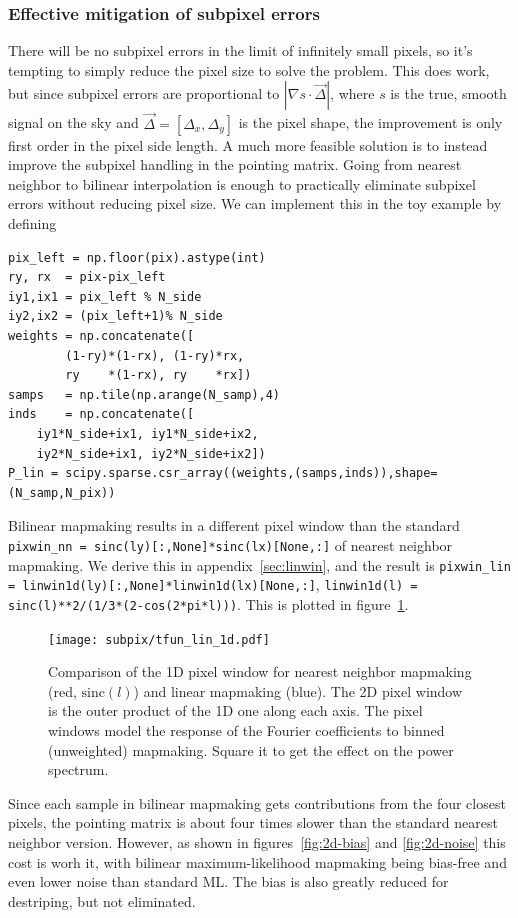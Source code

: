 \documentclass[twocolumn,apj]{aastex63}
\begin{document}
\subsubsection{Effective mitigation of subpixel errors}
There will be no subpixel errors in the limit of infinitely small pixels,
so it's tempting to simply reduce the pixel size to solve the problem. This
does work, but since subpixel errors are proportional to $|\nabla s \cdot \vec \Delta|$,
where $s$ is the true, smooth signal on the sky and $\vec \Delta = [\Delta_x,\Delta_y]$
is the pixel shape, the improvement is only first order in the pixel side length.
A much more feasible solution is to instead improve the subpixel handling in the
pointing matrix. Going from nearest neighbor to bilinear interpolation is enough
to practically eliminate subpixel errors without reducing pixel size. We can
implement this in the toy example by defining
\begin{lstlisting}
pix_left = np.floor(pix).astype(int)
ry, rx  = pix-pix_left
iy1,ix1 = pix_left % N_side
iy2,ix2 = (pix_left+1)% N_side
weights = np.concatenate([
		(1-ry)*(1-rx), (1-ry)*rx,
		ry    *(1-rx), ry    *rx])
samps   = np.tile(np.arange(N_samp),4)
inds    = np.concatenate([
	iy1*N_side+ix1, iy1*N_side+ix2,
	iy2*N_side+ix1, iy2*N_side+ix2])
P_lin = scipy.sparse.csr_array((weights,(samps,inds)),shape=(N_samp,N_pix))
\end{lstlisting}
Bilinear mapmaking results in a different pixel window than
the standard \lstinline{pixwin_nn = sinc(ly)[:,None]*sinc(lx)[None,:]}
of nearest neighbor mapmaking. We derive this in appendix~\ref{sec:linwin},
and the result is \lstinline{pixwin_lin = linwin1d(ly)[:,None]*linwin1d(lx)[None,:]},
\lstinline{linwin1d(l) = sinc(l)**2/(1/3*(2-cos(2*pi*l)))}. This is plotted in
figure~\ref{fig:linwin1d}.

\begin{figure}
	\centering
	\texttt{[image: subpix/tfun\_lin\_1d.pdf]}
	\caption{Comparison of the 1D pixel window for nearest neighbor
	mapmaking (red, $\text{sinc}(l)$) and linear mapmaking (blue). The 2D pixel window
	is the outer product of the 1D one along each axis. The pixel
	windows model the response of the Fourier coefficients to
	binned (unweighted) mapmaking. Square it to get the effect on
	the power spectrum.}
	\label{fig:linwin1d}
\end{figure}

Since each sample in bilinear mapmaking gets contributions from the four closest pixels,
the pointing matrix is about four times slower than the standard nearest neighbor
version. However, as shown in figures~\ref{fig:2d-bias} and \ref{fig:2d-noise}
this cost is worh it, with bilinear maximum-likelihood mapmaking being bias-free
and even lower noise than standard ML. The bias is also greatly reduced for
destriping, but not eliminated.
\end{document}
